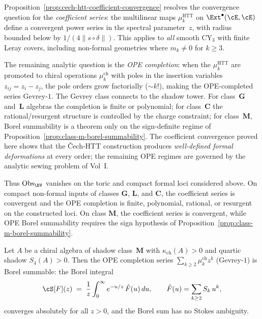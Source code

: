 \begin{remark}
\label{rem:coefficient-vs-ope-convergence}
Proposition~\textup{\ref{prop:cech-htt-coefficient-convergence}} resolves the convergence question for the \emph{coefficient series}: the multilinear maps $\mu_k^{\mathrm{HTT}}$ on $\Ext^\bullet(\cE, \cE)$ define a convergent power series in the spectral parameter~$z$, with radius bounded below by $1/(4\|s \circ \delta\|)$. This applies to \emph{all} smooth CY$_3$ with finite Leray covers, including non-formal geometries where $m_k \neq 0$ for $k \geq 3$.

The remaining analytic question is the \emph{OPE completion}: when the $\mu_k^{\mathrm{HTT}}$ are promoted to chiral operations $\mu_k^{\mathrm{ch}}$ with poles in the insertion variables $z_{ij} = z_i - z_j$, the pole orders grow factorially ($\sim k!$), making the OPE-completed series Gevrey-$1$. The Gevrey class connects to the shadow tower. For class~$\mathbf{G}$ and~$\mathbf{L}$ algebras the completion is finite or polynomial; for class~$\mathbf{C}$ the rational/resurgent structure is controlled by the charge constraint; for class~$\mathbf{M}$, Borel summability is a theorem only on the sign-definite regime of Proposition~\ref{prop:class-m-borel-summability}. The coefficient convergence proved here shows that the \v{C}ech-HTT construction produces \emph{well-defined formal deformations} at every order; the remaining OPE regimes are governed by the analytic sewing problem of Vol~I.

Thus \(\mathrm{Obs}_{\BV}\) vanishes on the toric and compact formal loci considered above. On compact non-formal inputs of classes \(\mathbf{G}\), \(\mathbf{L}\), and \(\mathbf{C}\), the coefficient series is convergent and the OPE completion is finite, polynomial, rational, or resurgent on the constructed loci. On class \(\mathbf{M}\), the coefficient series is convergent, while OPE Borel summability requires the sign hypothesis of Proposition~\ref{prop:class-m-borel-summability}.
\end{remark}

\begin{proposition}
\label{prop:class-m-borel-summability}
Let $A$ be a chiral algebra of shadow class~$\mathbf{M}$ with $\kappa_{\mathrm{ch}}(A) > 0$ and quartic shadow $S_4(A) > 0$. Then the OPE completion series $\sum_{k \geq 2} \mu_k^{\mathrm{ch}} z^k$ \textup{(}Gevrey-$1$\textup{)} is Borel summable: the Borel integral
\[
 \cS[F](z) \;=\; \frac{1}{z} \int_0^\infty e^{-u/z}\, \hat{F}(u)\, du,
 \qquad
 \hat{F}(u) = \sum_{k \geq 2} S_k\, u^k,
\]
converges absolutely for all $z > 0$, and the Borel sum has no Stokes ambiguity.
\end{proposition}


